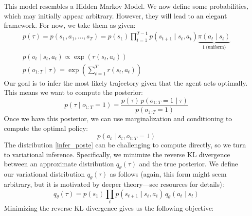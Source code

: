 This model resembles a Hidden Markov Model. We now define some probabilities, which may initially appear arbitrary. 
However, they will lead to an elegant framework. For now, we take them as given:
\begin{gather*}
    p(\tau) = p(s_1, a_1, \dots, s_T) = p(s_1) \prod_{t=1}^{T-1} p(s_{t+1} \mid s_t, a_t) \underbrace{\pi(a_t \mid s_t)}_{1\ 
    \text{(uniform)}} \\
    p(o_t \mid s_t, a_t) \propto \exp(r(s_t, a_t)) \\
    p(o_{1:T} \mid \tau) = \exp\left(\sum_{t=1}^T r(s_t, a_t)\right)
\end{gather*}
Our goal is to infer the most likely trajectory given that the agent acts optimally. This means we want to compute 
the posterior:
\begin{equation}
    p(\tau \mid o_{1:T} = 1) = \frac{p(\tau)\,p(o_{1:T} = 1 \mid \tau)}{p(o_{1:T} = 1)} \label{infer_poste}
\end{equation}
Once we have this posterior, we can use marginalization and conditioning to compute the optimal policy:
$$p(a_t \mid s_t, o_{1:T} = 1)$$
The distribution \eqref{infer_poste} can be challenging to compute directly, so we turn to variational inference. 
Specifically, we minimize the reverse KL divergence between an approximate distribution $q_\theta(\tau)$ and the true 
posterior.\newline
We define our variational distribution $q_\theta(\tau)$ as follows (again, this form might seem arbitrary, but it is 
motivated by deeper theory—see resources for details):
$$
q_\theta(\tau) = p(s_1) \prod_t p(s_{t+1} \mid s_t, a_t)\, q_\theta(a_t \mid s_t)
$$
Minimizing the reverse KL divergence gives us the following objective:
